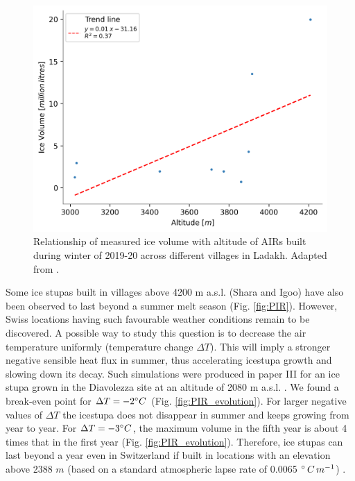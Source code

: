 \begin{figure}[htb]
\centering
\includegraphics[width=\textwidth]{figs/altitudevsvolume.png}
\caption{Relationship of measured ice volume with altitude of AIRs built during winter of 2019-20 across
different villages in Ladakh. Adapted from \citet{mariagruberIceStupasLadakh2022}.}
\label{fig:altvsvol}
\end{figure}

Some ice stupas built in villages above 4200 m a.s.l. (Shara and Igoo) have also been observed to last beyond a
summer melt season (Fig. \ref{fig:PIR}). However, Swiss locations having such favourable weather conditions
remain to be discovered. A possible way to study this question is to decrease the air temperature uniformly
(temperature change $\Delta T$). This will imply a stronger negative sensible heat flux in summer, thus
accelerating icestupa growth and slowing down its decay. Such simulations were produced in paper III for an ice
stupa grown in the Diavolezza site at an altitude of 2080 m a.s.l. . We found a break-even point for $\Delta T =
-2 ^{\circ} C$ (Fig. \ref{fig:PIR_evolution}). For larger negative values of $\Delta T$ the icestupa does not
disappear in summer and keeps growing from year to year. For $\Delta T = -3 ^{\circ} C$, the maximum volume in
the fifth year is about 4 times that in the first year (Fig. \ref{fig:PIR_evolution}). Therefore, ice stupas
can last beyond a year even in Switzerland if built in locations with an elevation above 2388 $m$ (based on a
standard atmospheric lapse rate of 0.0065 $^{\circ}\,C\,m^{-1}$) .

